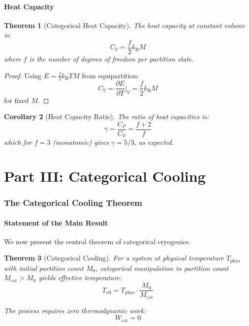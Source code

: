 \documentclass[twocolumn,10pt,twoside]{article}
\newtheorem{theorem}{Theorem}[section]
\newtheorem{corollary}[theorem]{Corollary}
\newcommand{\kb}{k_{\mathrm{B}}}
\newcommand{\Teff}{T_{\mathrm{eff}}}
\newcommand{\Tphys}{T_{\mathrm{phys}}}
\newcommand{\Mcat}{M_{\mathrm{cat}}}
\begin{document}
\subsection{Heat Capacity}

\begin{theorem}[Categorical Heat Capacity]
\label{thm:heat_capacity}
The heat capacity at constant volume is:
\begin{equation}
C_V = \frac{f}{2} \kb M
\label{eq:heat_capacity_cv}
\end{equation}
where $f$ is the number of degrees of freedom per partition state.
\end{theorem}

\begin{proof}
Using $E = \frac{f}{2} \kb T M$ from equipartition:
\begin{equation}
C_V = \frac{\partial E}{\partial T}\bigg|_V = \frac{f}{2} \kb M
\end{equation}
for fixed $M$.
\end{proof}

\begin{corollary}[Heat Capacity Ratio]
The ratio of heat capacities is:
\begin{equation}
\gamma = \frac{C_P}{C_V} = \frac{f+2}{f}
\end{equation}
which for $f = 3$ (monatomic) gives $\gamma = 5/3$, as expected.
\end{corollary}


\part*{Part III: Categorical Cooling}

\section{The Categorical Cooling Theorem}

\subsection{Statement of the Main Result}

We now present the central theorem of categorical cryogenics.

\begin{theorem}[Categorical Cooling]
\label{thm:categorical_cooling}
For a system at physical temperature $\Tphys$ with initial partition count $M_0$, categorical manipulation to partition count $\Mcat > M_0$ yields effective temperature:
\begin{equation}
\Teff = \Tphys \cdot \frac{M_0}{\Mcat}
\label{eq:cooling_formula}
\end{equation}

The process requires zero thermodynamic work:
\begin{equation}
W_{\text{cat}} = 0
\label{eq:zero_work_cooling}
\end{equation}
\end{theorem}
\end{document}
